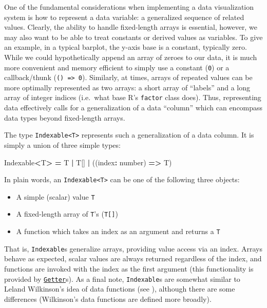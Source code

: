 \documentclass[
  openany]{book}
\newenvironment{Shaded}{\begin{snugshade}}{\end{snugshade}}
\newcommand{\DataTypeTok}[1]{\textcolor[rgb]{0.13,0.29,0.53}{#1}}
\newcommand{\KeywordTok}[1]{\textcolor[rgb]{0.13,0.29,0.53}{\textbf{#1}}}
\newcommand{\NormalTok}[1]{#1}
\newcommand{\OperatorTok}[1]{\textcolor[rgb]{0.81,0.36,0.00}{\textbf{#1}}}
\providecommand{\tightlist}{%
  \setlength{\itemsep}{0pt}\setlength{\parskip}{0pt}}
\theoremstyle{definition}
\theoremstyle{definition}
\theoremstyle{definition}
\theoremstyle{definition}
\theoremstyle{remark}
\begin{document}
One of the fundamental considerations when implementing a data visualization system is how to represent a data variable: a generalized sequence of related values. Clearly, the ability to handle fixed-length arrays is essential, however, we may also want to be able to treat constants or derived values as variables. To give an example, in a typical barplot, the y-axis base is a constant, typically zero. While we could hypothetically append an array of zeroes to our data, it is much more convenient and memory efficient to simply use a constant (\texttt{0}) or a callback/thunk (\texttt{()\ =\textgreater{}\ 0}). Similarly, at times, arrays of repeated values can be more optimally represented as two arrays: a short array of ``labels'' and a long array of integer indices (i.e.~what base R's \texttt{factor} class does). Thus, representing data effectively calls for a generalization of a data ``column'' which can encompass data types beyond fixed-length arrays.

The type \texttt{Indexable\textless{}T\textgreater{}} represents such a generalization of a data column. It is simply a union of three simple types:

\begin{Shaded}
\begin{Highlighting}[]
\NormalTok{Indexable}\OperatorTok{\textless{}}\NormalTok{T}\OperatorTok{\textgreater{}} \OperatorTok{=}\NormalTok{ T }\OperatorTok{|}\NormalTok{ T[] }\OperatorTok{|}\NormalTok{ ((index}\OperatorTok{:} \DataTypeTok{number}\NormalTok{) }\KeywordTok{=\textgreater{}}\NormalTok{ T)}
\end{Highlighting}
\end{Shaded}

In plain words, an \texttt{Indexable\textless{}T\textgreater{}} can be one of the following three objects:

\begin{itemize}
\tightlist
\item
  A simple (scalar) value \texttt{T}
\item
  A fixed-length array of \texttt{T}'s (\texttt{T{[}{]}})
\item
  A function which takes an index as an argument and returns a \texttt{T}
\end{itemize}

That is, \texttt{Indexable}s generalize arrays, providing value access via an index. Arrays behave as expected, scalar values are always returned regardless of the index, and functions are invoked with the index as the first argument (this functionality is provided by \hyperref[getter]{\texttt{Getter}}s). As a final note, \texttt{Indexable}s are somewhat similar to Leland Wilkinson's idea of data functions (see ), although there are some differences (Wilkinson's data functions are defined more broadly).
\end{document}
